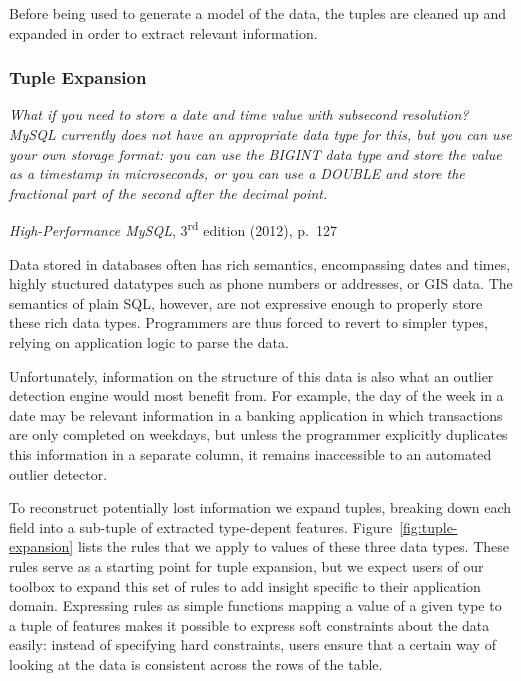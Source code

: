 
Before being used to generate a model of the data, the tuples are cleaned up and expanded in order to extract relevant information.

\subsubsection{Tuple Expansion}

\noindent\begin{minipage}{0.8\linewidth}
  \itshape
  What if you need to store a date and time value with subsecond resolution? MySQL
  currently does not have an appropriate data type for this, but you can use your own
  storage format: you can use the BIGINT data type and store the value as a timestamp in
  microseconds, or you can use a DOUBLE and store the fractional part of the second after
  the decimal point.
\end{minipage}
\begin{flushright}
  \textit{High-Performance MySQL}, 3\textsuperscript{rd} edition (2012), p.~127
\end{flushright}

Data stored in databases often has rich semantics, encompassing dates and times, highly stuctured datatypes such as phone numbers or addresses, or GIS data. The semantics of plain SQL, however, are not expressive enough to properly store these rich data types. Programmers are thus forced to revert to simpler types, relying on application logic to parse the data.

Unfortunately, information on the structure of this data is also what an outlier detection engine would most benefit from. For example, the day of the week in a date may be relevant information in a banking application in which transactions are only completed on weekdays, but unless the programmer explicitly duplicates this information in a separate column, it remains inaccessible to an automated outlier detector.

To reconstruct potentially lost information we expand tuples, breaking down each field into a sub-tuple of extracted type-depent features. Figure~\ref{fig:tuple-expansion} lists the rules that we apply to values of these three data types. These rules serve as a starting point for tuple expansion, but we expect users of our toolbox to expand this set of rules to add insight specific to their application domain. Expressing rules as simple functions mapping a value of a given type to a tuple of features makes it possible to express soft constraints about the data easily: instead of specifying hard constraints, users ensure that a certain way of looking at the data is consistent across the rows of the table.

